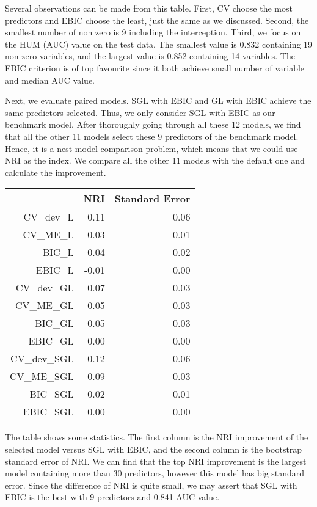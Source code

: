 \documentclass[]{article}
\begin{document}
Several observations can be made from this table. First, CV choose the most predictors and EBIC choose the least, just the same as we discussed. Second, the smallest number of non zero is 9 including the interception. Third, we focus on the HUM (AUC) value on the test data. The smallest value is 0.832 containing 19 non-zero variables, and the largest value is 0.852 containing 14 variables. The EBIC criterion is of top favourite since it both achieve small number of variable and median AUC value.

Next, we evaluate paired models. SGL with EBIC and GL with EBIC achieve the same predictors selected. Thus, we only consider SGL with EBIC as our benchmark model. After thoroughly going through all these 12 models, we find that all the other 11 models select these 9 predictors of the benchmark model. Hence, it is a nest model comparison problem, which means that we could use NRI as the index. We compare all the other 11 models with the default one and calculate the improvement.
\begin{table}[ht]
	\centering
	\begin{tabular}{rrr}
		\hline
		& NRI & Standard Error  \\ 
		\hline
		CV\_dev\_L & 0.11 &   0.06  \\ 
		CV\_ME\_L & 0.03 &   0.01  \\ 
		BIC\_L & 0.04 &   0.02 \\ 
		EBIC\_L & -0.01 &   0.00  \\ 
		CV\_dev\_GL & 0.07 &   0.03  \\ 
		CV\_ME\_GL & 0.05 &   0.03  \\ 
		BIC\_GL & 0.05 &   0.03   \\ 
		EBIC\_GL & 0.00 &    0.00  \\ 
		CV\_dev\_SGL & 0.12 &   0.06 \\ 
		CV\_ME\_SGL & 0.09 &   0.03 \\ 
		BIC\_SGL & 0.02 &   0.01  \\ 
		EBIC\_SGL & 0.00 &   0.00 \\ 
		\hline
	\end{tabular}
\end{table}

The table shows some statistics. The first column is the NRI improvement of the selected model versus SGL with EBIC, and the second column is the bootstrap standard error of NRI.
We can find that the top NRI improvement is the largest model containing more than 30 predictors, however this model has big standard error. Since the difference of NRI is quite small, we may assert that SGL with EBIC is the best with 9 predictors and 0.841 AUC value.
\end{document}
